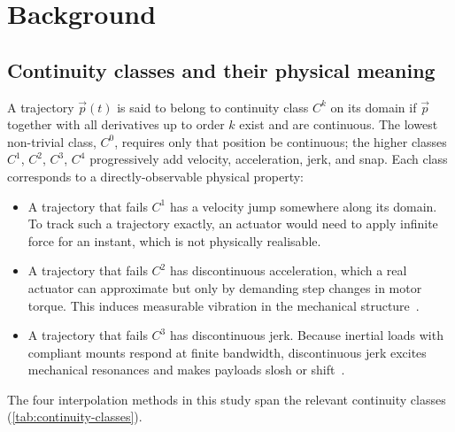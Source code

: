\section{Background}
\label{sec:background}

\subsection{Continuity classes and their physical meaning}
\label{sec:continuity}

A trajectory $\vec{p}(t)$ is said to belong to continuity class $C^k$
on its domain if $\vec{p}$ together with all derivatives up to order
$k$ exist and are continuous. The lowest non-trivial class, $C^0$,
requires only that position be continuous; the higher classes $C^1$,
$C^2$, $C^3$, $C^4$ progressively add velocity, acceleration, jerk,
and snap. Each class corresponds to a directly-observable physical
property:

\begin{itemize}[leftmargin=*]
\item A trajectory that fails $C^1$ has a velocity jump somewhere
along its domain. To track such a trajectory exactly, an actuator
would need to apply infinite force for an instant, which is not
physically realisable.
\item A trajectory that fails $C^2$ has discontinuous acceleration,
which a real actuator can approximate but only by demanding step
changes in motor torque. This induces measurable vibration in the
mechanical structure~\cite{macfarlane2003jerk}.
\item A trajectory that fails $C^3$ has discontinuous jerk. Because
inertial loads with compliant mounts respond at finite bandwidth,
discontinuous jerk excites mechanical resonances and makes payloads
slosh or shift~\cite{kyriakopoulos1988minimum}.
\end{itemize}

The four interpolation methods in this study span the relevant
continuity classes (\cref{tab:continuity-classes}).

